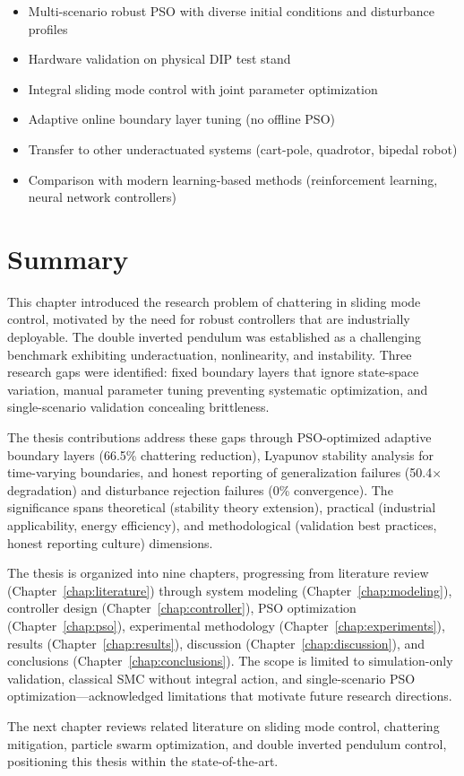 \begin{itemize}
    \item Multi-scenario robust PSO with diverse initial conditions and disturbance profiles
    \item Hardware validation on physical DIP test stand
    \item Integral sliding mode control with joint parameter optimization
    \item Adaptive online boundary layer tuning (no offline PSO)
    \item Transfer to other underactuated systems (cart-pole, quadrotor, bipedal robot)
    \item Comparison with modern learning-based methods (reinforcement learning, neural network controllers)
\end{itemize}

\section{Summary}
\label{sec:summary_intro}

This chapter introduced the research problem of chattering in sliding mode control, motivated by the need for robust controllers that are industrially deployable. The double inverted pendulum was established as a challenging benchmark exhibiting underactuation, nonlinearity, and instability. Three research gaps were identified: fixed boundary layers that ignore state-space variation, manual parameter tuning preventing systematic optimization, and single-scenario validation concealing brittleness.

The thesis contributions address these gaps through PSO-optimized adaptive boundary layers (66.5\% chattering reduction), Lyapunov stability analysis for time-varying boundaries, and honest reporting of generalization failures (50.4$\times$ degradation) and disturbance rejection failures (0\% convergence). The significance spans theoretical (stability theory extension), practical (industrial applicability, energy efficiency), and methodological (validation best practices, honest reporting culture) dimensions.

The thesis is organized into nine chapters, progressing from literature review (Chapter~\ref{chap:literature}) through system modeling (Chapter~\ref{chap:modeling}), controller design (Chapter~\ref{chap:controller}), PSO optimization (Chapter~\ref{chap:pso}), experimental methodology (Chapter~\ref{chap:experiments}), results (Chapter~\ref{chap:results}), discussion (Chapter~\ref{chap:discussion}), and conclusions (Chapter~\ref{chap:conclusions}). The scope is limited to simulation-only validation, classical SMC without integral action, and single-scenario PSO optimization—acknowledged limitations that motivate future research directions.

The next chapter reviews related literature on sliding mode control, chattering mitigation, particle swarm optimization, and double inverted pendulum control, positioning this thesis within the state-of-the-art.
